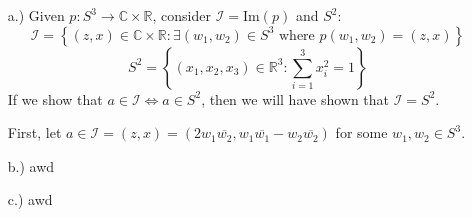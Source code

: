 \documentclass[11pt]{article}
\newcommand{\braces}[1]{\left\{#1\right\}}           %
\newcommand{\R}{\mathbb{R}}
\newcommand{\C}{\mathbb{C}}
\begin{document}
\pagestyle{fancy}
\fancyhead{}

\normalsize

\begin{itemize}
    \item [a.)] Given $p:S^3\to\C\times\R$, consider $\mathcal{I}=\text{Im}(p)$ and $S^2$:
    \[\mathcal{I}=\braces{(z,x)\in\C\times\R:\exists (w_1,w_2)\in S^3\text{ where }p(w_1,w_2)=(z,x)}\]
    \[S^2=\braces{(x_1,x_2,x_3)\in\mathbb{R}^3:\sum_{i=1}^3x_i^2=1}\] If we show that $a\in\mathcal{I}\iff a\in S^2$, then we will have shown that $\mathcal{I}=S^2$.

    First, let $a\in\mathcal{I}=(z,x)=(2w_1\overline{w_2},w_1\overline{w_1}-w_2\overline{w_2})$ for some $w_1,w_2\in S^3$.

    \item [b.)] awd
    
    \item [c.)] awd
\end{itemize}
\end{document}
